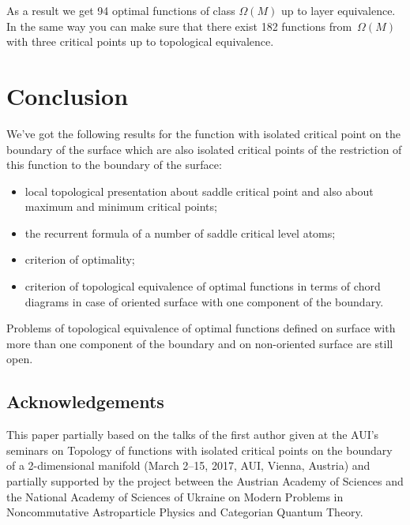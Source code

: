 \documentclass[10pt,a4paper]{amsart}
\numberwithin{equation}{section}
\begin{document}
As a result we get 94 optimal functions of class $\Omega(M)$ up to layer equivalence. In the same way you can make sure that there exist 182 functions from~$\Omega(M)$ with three critical points up to topological equivalence.

\section{Conclusion}

We've got the following results for the function with isolated critical point on the boundary of the surface which are also isolated critical points of the restriction of this function to the boundary of the surface:
\begin{itemize}\itemsep=0pt
\item local topological presentation about saddle critical point and also about maximum and minimum critical points;
\item the recurrent formula of a number of saddle critical level atoms;
\item criterion of optimality;
\item criterion of topological equivalence of optimal functions in terms of chord diagrams in case of oriented surface with one component of the boundary.
\end{itemize}

Problems of topological equivalence of optimal functions def\/ined on surface with more than one component of the boundary and on non-oriented surface are still open.

\subsection*{Acknowledgements}
This paper partially based on the talks of the f\/irst author given at the AUI's seminars on Topology of functions with isolated critical points on the boundary of a 2-dimensional manifold (March 2--15, 2017, AUI, Vienna, Austria) and partially supported by the project between the Austrian Academy of Sciences and the National Academy of Sciences of Ukraine on Modern Problems in Noncommutative Astroparticle Physics and Categorian Quantum Theory.

\end{document}
